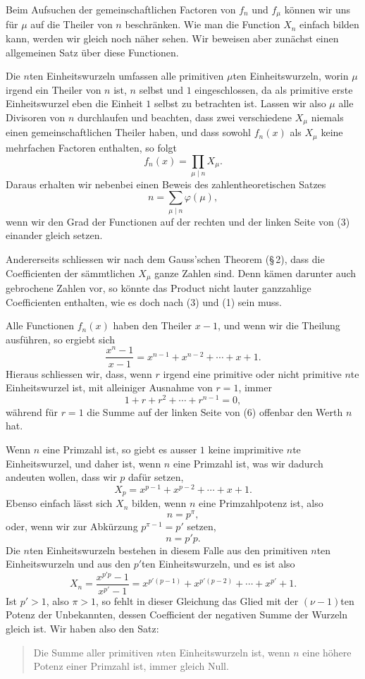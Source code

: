 \documentclass[11pt]{article}
\begin{document}
Beim Aufsuchen der gemeinschaftlichen Factoren von $f_n$ und $f_\mu$ können wir uns für $\mu$ auf die Theiler von $n$ beschränken. Wie man die Function $X_n$ einfach bilden kann, werden wir gleich noch näher sehen. Wir beweisen aber zunächst einen allgemeinen Satz über diese Functionen.

Die $n$ten Einheitswurzeln umfassen alle primitiven $\mu$ten Einheitswurzeln, worin $\mu$ irgend ein Theiler von $n$ ist, $n$ selbst und $1$ eingeschlossen, da als primitive erste Einheitswurzel eben die Einheit $1$ selbst zu betrachten ist. Lassen wir also $\mu$ alle Divisoren von $n$ durchlaufen und beachten, dass zwei verschiedene $X_\mu$ niemals einen gemeinschaftlichen Theiler haben, und dass sowohl $f_n(x)$ als $X_\mu$ keine mehrfachen Factoren enthalten, so folgt
\[
\tag{3}        f_n(x)=\prod_{\mu\mid n}X_\mu.
\]
Daraus erhalten wir nebenbei einen Beweis des zahlentheoretischen Satzes
\[
\tag{4}        n=\sum_{\mu\mid n}\varphi(\mu),
\]
wenn wir den Grad der Functionen auf der rechten und der linken Seite von (3) einander gleich setzen.

Andererseits schliessen wir nach dem Gauss'schen Theorem (\S\,2), dass die Coefficienten der sämmtlichen $X_\mu$ ganze Zahlen sind. Denn kämen darunter auch gebrochene Zahlen vor, so könnte das Product nicht lauter ganzzahlige Coefficienten enthalten, wie es doch nach (3) und (1) sein muss.

Alle Functionen $f_n(x)$ haben den Theiler $x-1$, und wenn wir die Theilung ausführen, so ergiebt sich
\[
\tag{5}        \frac{x^n-1}{x-1}=x^{n-1}+x^{n-2}+\cdots+x+1.
\]
Hieraus schliessen wir, dass, wenn $r$ irgend eine primitive oder nicht primitive $n$te Einheitswurzel ist, mit alleiniger Ausnahme von $r=1$, immer
\[
\tag{6}        1+r+r^2+\cdots+r^{n-1}=0,
\]
während für $r=1$ die Summe auf der linken Seite von (6) offenbar den Werth $n$ hat.

Wenn $n$ eine Primzahl ist, so giebt es ausser $1$ keine imprimitive $n$te Einheitswurzel, und daher ist, wenn $n$ eine Primzahl ist, was wir dadurch andeuten wollen, dass wir $p$ dafür setzen,
\[
\tag{7}        X_p=x^{p-1}+x^{p-2}+\cdots+x+1.
\]
Ebenso einfach lässt sich $X_n$ bilden, wenn $n$ eine Primzahlpotenz ist, also
\[
        n=p^\pi,
\]
oder, wenn wir zur Abkürzung $p^{\pi-1}=p'$ setzen,
\[
        n=p'p.
\]
Die $n$ten Einheitswurzeln bestehen in diesem Falle aus den primitiven $n$ten Einheitswurzeln und aus den $p'$ten Einheitswurzeln, und es ist also
\[
\tag{8}        X_n=\frac{x^{p'p}-1}{x^{p'}-1}=x^{p'(p-1)}+x^{p'(p-2)}+\cdots+x^{p'}+1.
\]
Ist $p'>1$, also $\pi>1$, so fehlt in dieser Gleichung das Glied mit der $(\nu-1)$ten Potenz der Unbekannten, dessen Coefficient der negativen Summe der Wurzeln gleich ist. Wir haben also den Satz:
\begin{quote}
Die Summe aller primitiven $n$ten Einheitswurzeln ist, wenn $n$ eine höhere Potenz einer Primzahl ist, immer gleich Null.
\end{quote}
\end{document}
